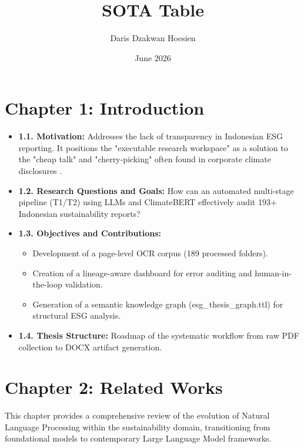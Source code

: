\documentclass{article}
\title{SOTA Table}
\author{Daris Dzakwan Hoesien}
\date{June 2026}
\begin{document}
\maketitle

\tableofcontents

\section*{Chapter 1: Introduction}
\begin{itemize}
\item 

\textbf{1.1. Motivation:} Addresses the lack of transparency in Indonesian ESG reporting. It positions the "executable research workspace" as a solution to the "cheap talk" and "cherry-picking" often found in corporate climate disclosures  \parencite{julia_bingler_268445e3}.\item 

\textbf{1.2. Research Questions and Goals:} How can an automated multi-stage pipeline (T1/T2) using LLMs and ClimateBERT effectively audit 193+ Indonesian sustainability reports?\item 

\textbf{1.3. Objectives and Contributions:}
\begin{itemize}
\item 

Development of a page-level OCR corpus (189 processed folders).\item 

Creation of a lineage-aware dashboard for error auditing and human-in-the-loop validation.\item 

Generation of a semantic knowledge graph (esg\_thesis\_graph.ttl) for structural ESG analysis.
\end{itemize}\item 

\textbf{1.4. Thesis Structure:} Roadmap of the systematic workflow from raw PDF collection to DOCX artifact generation.
\end{itemize}
\section*{Chapter 2: Related Works}

This chapter provides a comprehensive review of the evolution of Natural Language Processing within the sustainability domain, transitioning from foundational models to contemporary Large Language Model frameworks.
\end{document}
